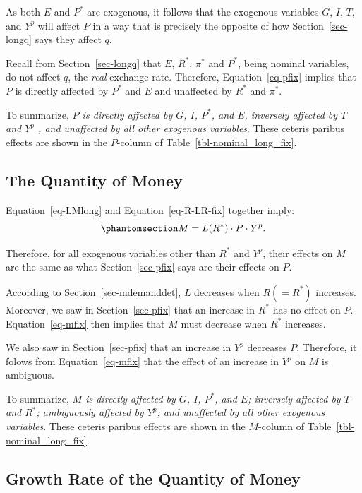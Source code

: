 \documentclass[
  letterpaper,
]{book}
\theoremstyle{plain}
\theoremstyle{remark}
\begin{document}
As both \(E\) and \(P^*\) are exogenous, it follows that the exogenous
variables \(G\), \(I\), \(T\), and \(Y^p\) will affect \(P\) in a way
that is precisely the opposite of how Section~\ref{sec-longq} says they
affect \(q\).

Recall from Section~\ref{sec-longq} that \(E\), \(R^*\), \(\pi^*\) and
\(P^*\), being nominal variables, do not affect \(q\), the \emph{real}
exchange rate. Therefore, Equation~\ref{eq-pfix} implies that \(P\) is
directly affected by \(P^*\) and \(E\) and unaffected by \(R^*\) and
\(\pi^*\).

To summarize, \emph{\(P\) is directly affected by \(G\), \(I\), \(P^*\),
and \(E\), inversely affected by \(T\) and \(Y^p\) , and unaffected by
all other exogenous variables}. These ceteris paribus effects are shown
in the \(P\)-column of Table~\ref{tbl-nominal_long_fix}.

\subsection{The Quantity of Money}\label{sec-mfix}

Equation~\ref{eq-LMlong} and Equation~\ref{eq-R-LR-fix} together imply:
\begin{equation}\phantomsection\label{eq-mfix}{
M=L(R^*)\cdot P\cdot Y^p.
}\end{equation}

Therefore, for all exogenous variables other than \(R^*\) and \(Y^p\),
their effects on \(M\) are the same as what Section~\ref{sec-pfix} says
are their effects on \(P\).

According to Section~\ref{sec-mdemanddet}, \(L\) decreases when
\(R(=R^*)\) increases. Moreover, we saw in Section~\ref{sec-pfix} that
an increase in \(R^*\) has no effect on \(P\). Equation~\ref{eq-mfix}
then implies that \(M\) must decrease when \(R^*\) increases.

We also saw in Section~\ref{sec-pfix} that an increase in \(Y^p\)
decreases \(P\). Therefore, it folows from Equation~\ref{eq-mfix} that
the effect of an increase in \(Y^p\) on \(M\) is ambiguous.

To summarize, \emph{\(M\) is directly affected by \(G\), \(I\), \(P^*\),
and \(E\); inversely affected by \(T\) and \(R^*\); ambiguously affected
by \(Y^p\); and unaffected by all other exogenous variables}. These
ceteris paribus effects are shown in the \(M\)-column of
Table~\ref{tbl-nominal_long_fix}.

\subsection{Growth Rate of the Quantity of Money}\label{sec-mgfix}
\end{document}
